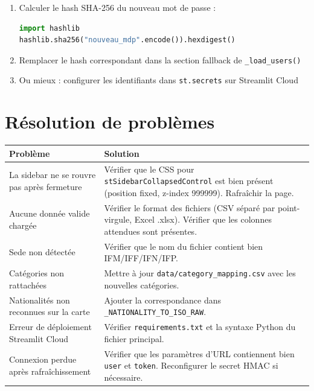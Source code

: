 \documentclass[12pt,a4paper,twoside]{article}
\begin{document}
\begin{enumerate}[leftmargin=2em]
  \item Calculer le hash SHA-256 du nouveau mot de passe :
\begin{lstlisting}[language=Python]
import hashlib
hashlib.sha256("nouveau_mdp".encode()).hexdigest()
\end{lstlisting}
  \item Remplacer le hash correspondant dans la section fallback de \texttt{\_load\_users()}
  \item Ou mieux : configurer les identifiants dans \texttt{st.secrets} sur Streamlit Cloud
\end{enumerate}

\section{R\'{e}solution de probl\`{e}mes}

\begin{longtable}{p{5cm}p{9cm}}
\toprule
\textbf{Probl\`{e}me} & \textbf{Solution} \\
\midrule
\endhead
La sidebar ne se rouvre pas apr\`{e}s fermeture & V\'{e}rifier que le CSS pour \texttt{stSidebarCollapsedControl} est bien pr\'{e}sent (position fixed, z-index 999999). Rafra\^{i}chir la page. \\
\addlinespace
\og{}Aucune donn\'{e}e valide charg\'{e}e\fg{} & V\'{e}rifier le format des fichiers (CSV s\'{e}par\'{e} par point-virgule, Excel .xlsx). V\'{e}rifier que les colonnes attendues sont pr\'{e}sentes. \\
\addlinespace
Sede non d\'{e}tect\'{e}e & V\'{e}rifier que le nom du fichier contient bien IFM/IFF/IFN/IFP. \\
\addlinespace
Cat\'{e}gories non rattach\'{e}es & Mettre \`{a} jour \texttt{data/category\_mapping.csv} avec les nouvelles cat\'{e}gories. \\
\addlinespace
Nationalit\'{e}s non reconnues sur la carte & Ajouter la correspondance dans \texttt{\_NATIONALITY\_TO\_ISO\_RAW}. \\
\addlinespace
Erreur de d\'{e}ploiement Streamlit Cloud & V\'{e}rifier \texttt{requirements.txt} et la syntaxe Python du fichier principal. \\
\addlinespace
Connexion perdue apr\`{e}s rafra\^{i}chissement & V\'{e}rifier que les param\`{e}tres d'URL contiennent bien \texttt{user} et \texttt{token}. Reconfigurer le secret HMAC si n\'{e}cessaire. \\
\bottomrule
\end{longtable}
\end{document}
